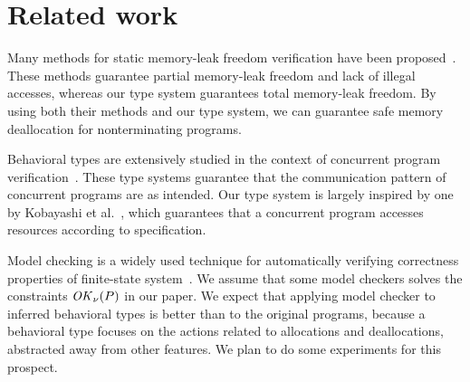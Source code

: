 
\section{Related work}\label{sec:relatedwork}
Many methods for static memory-leak freedom verification have been
proposed~\cite{DBLP:conf/aplas/SuenagaK09,DBLP:conf/pldi/HeineL03,DBLP:conf/sigsoft/XieA05,DBLP:journals/scp/SwamyHMGJ06,DBLP:conf/sas/OrlovichR06,DBLP:conf/issta/SuiYX12}. These
methods guarantee partial memory-leak freedom and lack of illegal
accesses, whereas our type system guarantees total memory-leak
freedom. By using both their methods and our type system, we can
guarantee safe memory deallocation for nonterminating programs.

Behavioral types are extensively studied in the context of concurrent
program
verification~\cite{DBLP:conf/esop/HondaVK98,DBLP:journals/tcs/IgarashiK04,DBLP:conf/esop/VieiraCS08,DBLP:journals/lmcs/KobayashiSW06}.
These type systems guarantee that the communication pattern of
concurrent programs are as intended.  Our type system is largely
inspired by one by Kobayashi et
al.~\cite{DBLP:journals/lmcs/KobayashiSW06}, which guarantees that a
concurrent program accesses resources according to specification.

Model checking is a widely used technique for automatically verifying
correctness properties of finite-state
system~\cite{clarke1999model,ben2008principles,beyer2011cpachecker}. We
assume that some model checkers solves the constraints \(\mathit{OK}_\nu(P)\)
in our paper. We expect that applying model checker to inferred
behavioral types is better than to the original programs, because a
behavioral type focuses on the actions related to allocations and
deallocations, abstracted away from other features. We plan to do some
experiments for this prospect.


